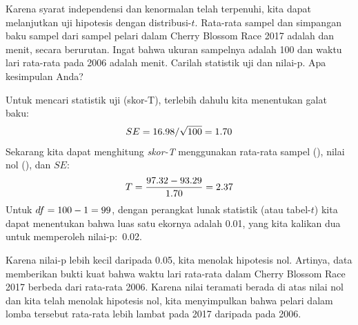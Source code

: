 \D{\newpage}


\begin{examplewrap}
\begin{nexample}{Karena syarat independensi
    dan kenormalan telah terpenuhi,
    kita dapat melanjutkan uji hipotesis dengan
    distribusi-$t$.
    Rata-rata sampel dan simpangan baku sampel
    dari sampel
    \cherryblossomn{} pelari dalam
    Cherry Blossom Race 2017
    adalah \cherryblossommean{} dan \cherryblossomsd{} menit,
    secara berurutan.
    Ingat bahwa ukuran sampelnya adalah 100
    dan waktu lari rata-rata pada 2006 adalah
    \cherryblossomnull{} menit.
    Carilah statistik uji dan nilai-p.
    Apa kesimpulan Anda?}

  Untuk mencari statistik uji (skor-T),
  terlebih dahulu kita menentukan galat baku:
  \begin{align*}
  SE
    = 16.98{} / \sqrt{100{}}
    = 1.70{}
  \end{align*}
  Sekarang kita dapat menghitung \emph{skor-T}
  menggunakan rata-rata sampel (\cherryblossommean{}),
  nilai nol (\cherryblossomnull{}), dan $SE$:
  \begin{align*}
  T
    = \frac{97.32{} - 93.29{}}
        {1.70{}}
    = 2.37{}
  \end{align*}
  Untuk $df = 100{} - 1 = 99$,
  dengan perangkat lunak statistik
  (atau tabel-$t$) kita dapat menentukan bahwa luas satu ekornya adalah 0.01,
  yang kita kalikan dua untuk memperoleh nilai-p:~0.02.

  Karena nilai-p lebih kecil daripada 0.05,
  kita menolak hipotesis nol.
  Artinya, data memberikan bukti kuat bahwa waktu lari
  rata-rata dalam Cherry Blossom Race 2017 berbeda
  dari rata-rata 2006.
  Karena nilai teramati berada di atas nilai nol
  dan kita telah menolak hipotesis nol, kita menyimpulkan
  bahwa pelari dalam lomba tersebut rata-rata lebih lambat pada 2017
  daripada pada 2006.
\end{nexample}
\end{examplewrap}

